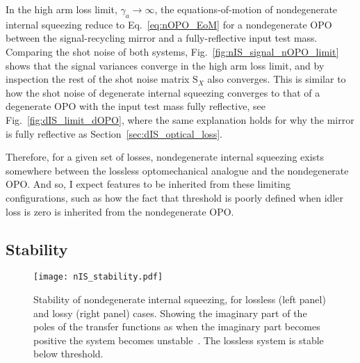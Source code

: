 In the high arm loss limit, $\gamma_a\rightarrow\infty$, the equations-of-motion of nondegenerate internal squeezing reduce to Eq.~\ref{eq:nOPO_EoM} for a nondegenerate OPO between the signal-recycling mirror and a fully-reflective input test mass. Comparing the shot noise of both systems, Fig.~\ref{fig:nIS_signal_nOPO_limit} shows that the signal variances converge in the high arm loss limit, and by inspection the rest of the shot noise matrix $\text{S}_X$ also converges. This is similar to how the shot noise of degenerate internal squeezing converges to that of a degenerate OPO with the input test mass fully reflective, see Fig.~\ref{fig:dIS_limit_dOPO}, where the same explanation holds for why the mirror is fully reflective as Section~\ref{sec:dIS_optical_loss}. 

Therefore, for a given set of losses, nondegenerate internal squeezing exists somewhere between the lossless optomechanical analogue and the nondegenerate OPO. And so, I expect features to be inherited from these limiting configurations, such as how the fact that threshold is poorly defined when idler loss is zero is inherited from the nondegenerate OPO.


\subsection{Stability}
\label{sec:nIS_stability}

\begin{figure}
	\centering
	\texttt{[image: nIS\_stability.pdf]}
	\caption{  Stability of nondegenerate internal squeezing, for lossless (left panel) and lossy (right panel) cases. Showing the imaginary part of the poles of the transfer functions as when the imaginary part becomes positive the system becomes unstable~\cite{}. The lossless system is stable below threshold. }
	\label{fig:nIS_stability}
\end{figure}


